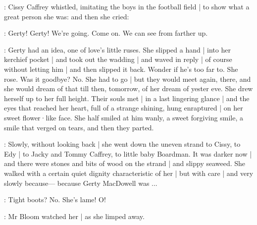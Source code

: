 :
Cissy Caffrey whistled,
imitating the boys in the football field |
to show what a great person she was:
and then she cried:

\cissy:
Gerty!
Gerty!
We're going.
Come on.
We can see from farther up.

:
Gerty had an idea,
one of love's little ruses.
She slipped a hand |
into her kerchief pocket |
and took out the wadding |
and waved in reply |
of course 
without letting him |
and then slipped it back.
Wonder if he's too far to.
She rose.
Was it goodbye?%
No.
She had to go |
but they would meet again,
there,
and she would dream of that till then,
tomorrow,
of her dream of yester eve.
She drew herself up to her full height.
Their souls met |
in a last lingering glance |
and the eyes that reached her heart,
full of a strange shining,
hung enraptured |
on her sweet flower·like face.
She half smiled at him wanly,
a sweet forgiving smile,
a smile that verged on tears,
and then they parted.

:
Slowly,
without looking back |
she went down the uneven strand to Cissy,
to Edy |
to Jacky and Tommy Caffrey,
to little baby Boardman.
It was darker now |
and there were stones and bits of wood on the strand |
and slippy seaweed.
She walked with a certain quiet dignity characteristic of her |
but with care |%
and very slowly because—%
because Gerty MacDowell was ...

\Bloom:
Tight boots?
No.
She's lame!
O!

:
Mr Bloom watched her |
as she limped away.

